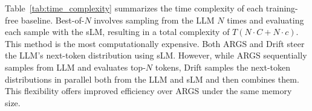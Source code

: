Table~\ref{tab:time_complexity} summarizes the time complexity of each training-free baseline. 
Best-of-$N$ involves sampling from the LLM $N$ times and evaluating each sample with the sLM, resulting in a total complexity of $T(N\cdot C + N\cdot c)$. This method is the most computationally expensive. Both ARGS and Drift steer the LLM's next-token distribution using sLM. However, while ARGS sequentially samples from LLM and evaluates top-$N$ tokens, Drift samples the next-token distributions in parallel both from the LLM and sLM and then combines them. This flexibility offers improved efficiency over ARGS under the same memory size.
